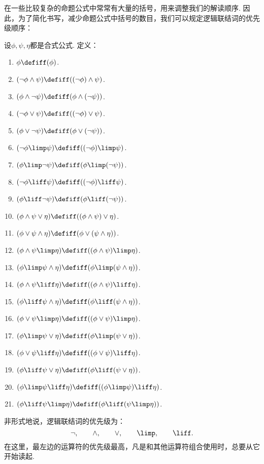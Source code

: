 在一些比较复杂的命题公式中常常有大量的括号，用来调整我们的解读顺序.
因此，为了简化书写，减少命题公式中括号的数目，我们可以规定逻辑联结词的优先级顺序：
\begin{definition}
设\(\phi,\psi,\eta\)都是合式公式.
定义：
\begin{enumerate}
	\item \(\phi
	\defiff
	(\phi)\).
	\item \((\neg\phi\land\psi)
	\defiff
	((\neg\phi)\land\psi)\).
	\item \((\phi\land\neg\psi)
	\defiff
	(\phi\land(\neg\psi))\).
	\item \((\neg\phi\lor\psi)
	\defiff
	((\neg\phi)\lor\psi)\).
	\item \((\phi\lor\neg\psi)
	\defiff
	(\phi\lor(\neg\psi))\).
	\item \((\neg\phi\limp\psi)
	\defiff
	((\neg\phi)\limp\psi)\).
	\item \((\phi\limp\neg\psi)
	\defiff
	(\phi\limp(\neg\psi))\).
	\item \((\neg\phi\liff\psi)
	\defiff
	((\neg\phi)\liff\psi)\).
	\item \((\phi\liff\neg\psi)
	\defiff
	(\phi\liff(\neg\psi))\).
	\item \((\phi\land\psi\lor\eta)
	\defiff
	((\phi\land\psi)\lor\eta)\).
	\item \((\phi\lor\psi\land\eta)
	\defiff
	(\phi\lor(\psi\land\eta))\).
	\item \((\phi\land\psi\limp\eta)
	\defiff
	((\phi\land\psi)\limp\eta)\).
	\item \((\phi\limp\psi\land\eta)
	\defiff
	(\phi\limp(\psi\land\eta))\).
	\item \((\phi\land\psi\liff\eta)
	\defiff
	((\phi\land\psi)\liff\eta)\).
	\item \((\phi\liff\psi\land\eta)
	\defiff
	(\phi\liff(\psi\land\eta))\).
	\item \((\phi\lor\psi\limp\eta)
	\defiff
	((\phi\lor\psi)\limp\eta)\).
	\item \((\phi\limp\psi\lor\eta)
	\defiff
	(\phi\limp(\psi\lor\eta))\).
	\item \((\phi\lor\psi\liff\eta)
	\defiff
	((\phi\lor\psi)\liff\eta)\).
	\item \((\phi\liff\psi\lor\eta)
	\defiff
	(\phi\liff(\psi\lor\eta))\).
	\item \((\phi\limp\psi\liff\eta)
	\defiff
	((\phi\limp\psi)\liff\eta)\).
	\item \((\phi\liff\psi\limp\eta)
	\defiff
	(\phi\liff(\psi\limp\eta))\).
\end{enumerate}
\end{definition}
非形式地说，逻辑联结词的优先级为：\[
	\neg, \qquad
	\land, \qquad
	\lor, \qquad
	\limp, \qquad
	\liff.
\]
在这里，最左边的运算符的优先级最高，凡是和其他运算符组合使用时，总要从它开始读起.

